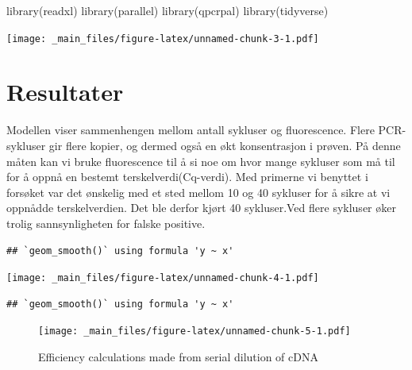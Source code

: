 \documentclass[
]{book}
\newenvironment{Shaded}{\begin{snugshade}}{\end{snugshade}}
\newcommand{\FunctionTok}[1]{\textcolor[rgb]{0.00,0.00,0.00}{#1}}
\newcommand{\NormalTok}[1]{#1}
\begin{document}
\begin{Shaded}
\begin{Highlighting}[]
\FunctionTok{library}\NormalTok{(readxl)}
\FunctionTok{library}\NormalTok{(parallel)}
\FunctionTok{library}\NormalTok{(qpcrpal)}
\FunctionTok{library}\NormalTok{(tidyverse)}
\end{Highlighting}
\end{Shaded}

\texttt{[image: \_main\_files/figure-latex/unnamed-chunk-3-1.pdf]}

\hypertarget{resultater-2}{%
\section{Resultater}\label{resultater-2}}

Modellen viser sammenhengen mellom antall sykluser og fluorescence. Flere PCR-sykluser gir flere kopier, og dermed også en økt konsentrasjon i prøven. På denne måten kan vi bruke fluorescence til å si noe om hvor mange sykluser som må til for å oppnå en bestemt terskelverdi(Cq-verdi). Med primerne vi benyttet i forsøket var det ønskelig med et sted mellom 10 og 40 sykluser for å sikre at vi oppnådde terskelverdien. Det ble derfor kjørt 40 sykluser.Ved flere sykluser øker trolig sannsynligheten for falske positive.

\begin{verbatim}
## `geom_smooth()` using formula 'y ~ x'
\end{verbatim}

\texttt{[image: \_main\_files/figure-latex/unnamed-chunk-4-1.pdf]}

\begin{verbatim}
## `geom_smooth()` using formula 'y ~ x'
\end{verbatim}

\begin{figure}
\centering
\texttt{[image: \_main\_files/figure-latex/unnamed-chunk-5-1.pdf]}
\caption{\label{fig:unnamed-chunk-5}Efficiency calculations made from serial dilution of cDNA}
\end{figure}
\end{document}

